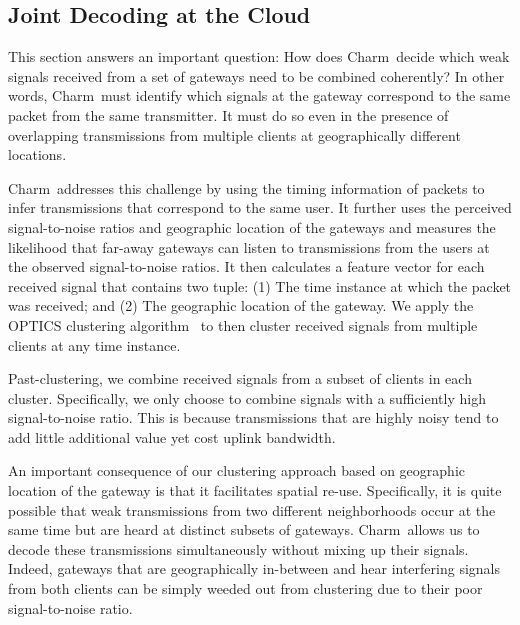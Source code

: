 




\subsection{Joint Decoding at the Cloud}
\label{sec:joint-decoding-cloud}
This section answers an important question: How does Charm\ decide which weak signals received from a set of gateways need to be combined coherently? In other words, Charm\ must identify which signals at the gateway correspond to the same packet from the same transmitter. It must do so even in the presence of overlapping transmissions from multiple clients at geographically different locations. \vspace*{0.1in}

 Charm\ addresses this challenge by using the timing information of packets to infer transmissions that correspond to the same user. It further uses the perceived signal-to-noise ratios and geographic location of the gateways and measures the likelihood that far-away gateways can listen to transmissions from the users at the observed signal-to-noise ratios. It then calculates a feature vector for each received signal that contains two tuple: (1) The time instance at which the packet was received; and (2) The geographic location of the gateway. We apply the OPTICS clustering algorithm~\cite{ankerst1999optics} to then cluster received signals from multiple clients at any time instance. 

Past-clustering, we combine received signals from a subset of clients in each cluster. Specifically, we only choose to combine signals with a sufficiently high signal-to-noise ratio. This is because transmissions that are highly noisy tend to add little additional value yet cost uplink bandwidth. 

An important consequence of our clustering approach based on geographic location of the gateway is that it facilitates spatial re-use. Specifically, it is quite possible that weak transmissions from two different neighborhoods occur at the same time but are heard at distinct subsets of gateways. Charm\ allows us to decode these transmissions simultaneously without mixing up their signals. Indeed, gateways that are geographically in-between and hear interfering signals from both clients can be simply weeded out from clustering due to their poor signal-to-noise ratio. 

